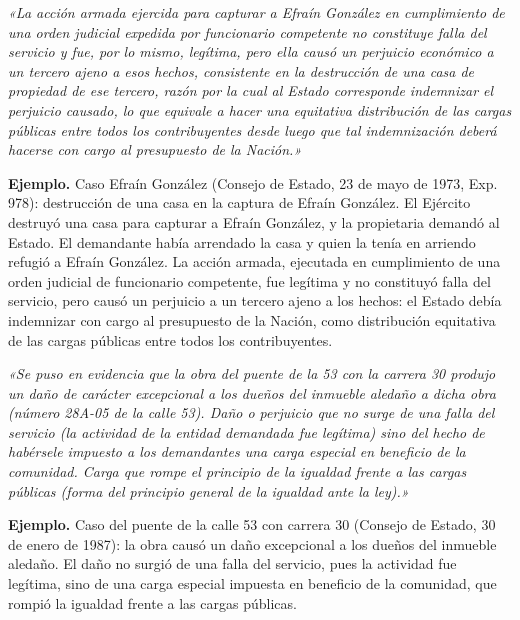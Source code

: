 \begin{cita}
\textit{«La acción armada ejercida para capturar a Efraín González en cumplimiento de una orden judicial expedida por funcionario competente no constituye falla del servicio y fue, por lo mismo, legítima, pero ella causó un perjuicio económico a un tercero ajeno a esos hechos, consistente en la destrucción de una casa de propiedad de ese tercero, razón por la cual al Estado corresponde indemnizar el perjuicio causado, lo que equivale a hacer una equitativa distribución de las cargas públicas entre todos los contribuyentes desde luego que tal indemnización deberá hacerse con cargo al presupuesto de la Nación.»}
\end{cita}
\begin{ejemplo}
\textcolor[HTML]{4F6228}{\textbf{Ejemplo. }}Caso Efraín González (Consejo de Estado, 23 de mayo de 1973, Exp. 978): destrucción de una casa en la captura de Efraín González. El Ejército destruyó una casa para capturar a Efraín González, y la propietaria demandó al Estado. El demandante había arrendado la casa y quien la tenía en arriendo refugió a Efraín González. La acción armada, ejecutada en cumplimiento de una orden judicial de funcionario competente, fue legítima y no constituyó falla del servicio, pero causó un perjuicio a un tercero ajeno a los hechos: el Estado debía indemnizar con cargo al presupuesto de la Nación, como distribución equitativa de las cargas públicas entre todos los contribuyentes.
\end{ejemplo}
\begin{cita}
\textit{«Se puso en evidencia que la obra del puente de la 53 con la carrera 30 produjo un daño de carácter excepcional a los dueños del inmueble aledaño a dicha obra (número 28A-05 de la calle 53). Daño o perjuicio que no surge de una falla del servicio (la actividad de la entidad demandada fue legítima) sino del hecho de habérsele impuesto a los demandantes una carga especial en beneficio de la comunidad. Carga que rompe el principio de la igualdad frente a las cargas públicas (forma del principio general de la igualdad ante la ley).»}
\end{cita}
\begin{ejemplo}
\textcolor[HTML]{4F6228}{\textbf{Ejemplo. }}Caso del puente de la calle 53 con carrera 30 (Consejo de Estado, 30 de enero de 1987): la obra causó un daño excepcional a los dueños del inmueble aledaño. El daño no surgió de una falla del servicio, pues la actividad fue legítima, sino de una carga especial impuesta en beneficio de la comunidad, que rompió la igualdad frente a las cargas públicas.
\end{ejemplo}
